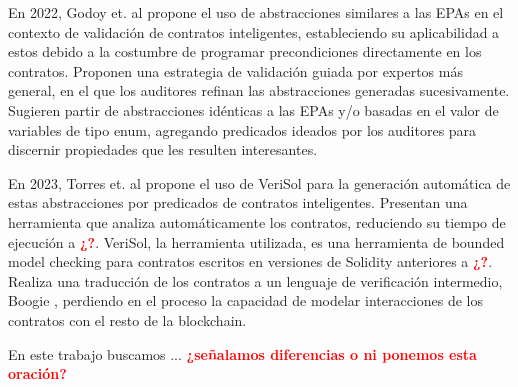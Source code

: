 En 2022, Godoy et. al \cite{predicate-abstraction-for-smart-contract-validation} propone el uso de abstracciones similares a las EPAs en el contexto de validación de contratos inteligentes, estableciendo su aplicabilidad a estos debido a la costumbre de programar precondiciones directamente en los contratos.
Proponen una estrategia de validación guiada por expertos más general, en el que los auditores refinan las abstracciones generadas sucesivamente.
Sugieren partir de abstracciones idénticas a las EPAs y/o basadas en el valor de variables de tipo enum, agregando predicados ideados por los auditores para discernir propiedades que les resulten interesantes.

En 2023, Torres et. al \cite{torres} propone el uso de VeriSol \cite{verisol} para la generación automática de estas abstracciones por predicados de contratos inteligentes.
Presentan una herramienta que analiza automáticamente los contratos, reduciendo su tiempo de ejecución a \textcolor{red}{\textbf{¿?}}.
VeriSol, la herramienta utilizada, es una herramienta de bounded model checking para contratos escritos en versiones de Solidity anteriores a \textcolor{red}{\textbf{¿?}}.
Realiza una traducción de los contratos a un lenguaje de verificación intermedio, Boogie \cite{boogie}, perdiendo en el proceso la capacidad de modelar interacciones de los contratos con el resto de la blockchain.

En este trabajo buscamos ... \textcolor{red}{\textbf{¿señalamos diferencias o ni ponemos esta oración?}}
